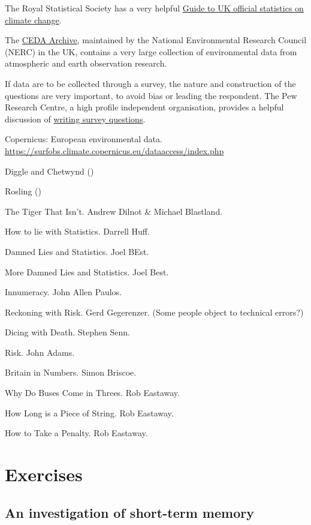 \documentclass[
]{book}
\begin{document}
The Royal Statistical Society has a very helpful \href{https://rss.org.uk/RSS/media/File-library/Policy/2025/RSS-CCTF-guide-to-UK-official-statistics-on-climate-change.pdf}{Guide to UK official statistics on climate change}.

The \href{https://archive.ceda.ac.uk}{CEDA Archive}, maintained by the National Environmental Research Council (NERC) in the UK, contains a very large collection of environmental data from atmospheric and earth observation research.

If data are to be collected through a survey, the nature and construction of the questions are very important, to avoid bias or leading the respondent. The Pew Research Centre, a high profile independent organisation, provides a helpful discussion of \href{https://www.pewresearch.org/our-methods/u-s-surveys/writing-survey-questions/}{writing survey questions}.

Copernicus: European environmental data.
\url{https://surfobs.climate.copernicus.eu/dataaccess/index.php}

Diggle and Chetwynd ()

Rosling ()

The Tiger That Isn't. Andrew Dilnot \& Michael Blastland.

How to lie with Statistics. Darrell Huff.

Damned Lies and Statistics. Joel BEst.

More Damned Lies and Statistics. Joel Best.

Innumeracy. John Allen Paulos.

Reckoning with Risk. Gerd Gegerenzer. (Some people object to technical errors?)

Dicing with Death. Stephen Senn.

Risk. John Adams.

Britain in Numbers. Simon Briscoe.

Why Do Buses Come in Threes. Rob Eastaway.

How Long is a Piece of String. Rob Eastaway.

How to Take a Penalty. Rob Eastaway.

\section{Exercises}\label{exercises}

\subsection{An investigation of short-term memory}\label{an-investigation-of-short-term-memory}
\end{document}
